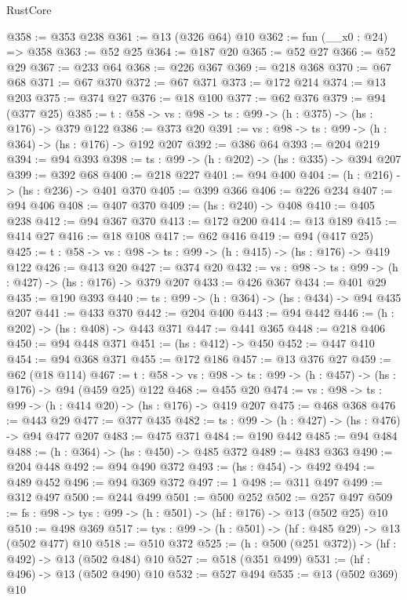 \begin{lexlean}{RustCore}
\begin{coremodule}
@358 := @353 @238
@361 := @13 (@326 @64) @10
@362 := fun (__x0 : @24) => @358
@363 := @52 @25
@364 := @187 @20
@365 := @52 @27
@366 := @52 @29
@367 := @233 @64
@368 := @226 @367
@369 := @218 @368
@370 := @67 @68
@371 := @67 @370
@372 := @67 @371
@373 := @172 @214
@374 := @13 @203
@375 := @374 @27
@376 := @18 @100
@377 := @62 @376
@379 := @94 (@377 @25)
@385 := {t : @58} -> {vs : @98} -> {ts : @99} -> (h : @375) -> (hs : @176) -> @379 @122
@386 := @373 @20
@391 := {vs : @98} -> {ts : @99} -> (h : @364) -> (hs : @176) -> @192 @207
@392 := @386 @64
@393 := @204 @219
@394 := @94 @393
@398 := {ts : @99} -> (h : @202) -> (hs : @335) -> @394 @207
@399 := @392 @68
@400 := @218 @227
@401 := @94 @400
@404 := (h : @216) -> (hs : @236) -> @401 @370
@405 := @399 @366
@406 := @226 @234
@407 := @94 @406
@408 := @407 @370
@409 := (hs : @240) -> @408
@410 := @405 @238
@412 := @94 @367 @370
@413 := @172 @200
@414 := @13 @189
@415 := @414 @27
@416 := @18 @108
@417 := @62 @416
@419 := @94 (@417 @25)
@425 := {t : @58} -> {vs : @98} -> {ts : @99} -> (h : @415) -> (hs : @176) -> @419 @122
@426 := @413 @20
@427 := @374 @20
@432 := {vs : @98} -> {ts : @99} -> (h : @427) -> (hs : @176) -> @379 @207
@433 := @426 @367
@434 := @401 @29
@435 := @190 @393
@440 := {ts : @99} -> (h : @364) -> (hs : @434) -> @94 @435 @207
@441 := @433 @370
@442 := @204 @400
@443 := @94 @442
@446 := (h : @202) -> (hs : @408) -> @443 @371
@447 := @441 @365
@448 := @218 @406
@450 := @94 @448 @371
@451 := (hs : @412) -> @450
@452 := @447 @410
@454 := @94 @368 @371
@455 := @172 @186
@457 := @13 @376 @27
@459 := @62 (@18 @114)
@467 := {t : @58} -> {vs : @98} -> {ts : @99} -> (h : @457) -> (hs : @176) -> @94 (@459 @25) @122
@468 := @455 @20
@474 := {vs : @98} -> {ts : @99} -> (h : @414 @20) -> (hs : @176) -> @419 @207
@475 := @468 @368
@476 := @443 @29
@477 := @377 @435
@482 := {ts : @99} -> (h : @427) -> (hs : @476) -> @94 @477 @207
@483 := @475 @371
@484 := @190 @442
@485 := @94 @484
@488 := (h : @364) -> (hs : @450) -> @485 @372
@489 := @483 @363
@490 := @204 @448
@492 := @94 @490 @372
@493 := (hs : @454) -> @492
@494 := @489 @452
@496 := @94 @369 @372
@497 := 1
@498 := @311 @497
@499 := @312 @497
@500 := @244 @499
@501 := @500 @252
@502 := @257 @497
@509 := {fs : @98} -> {tys : @99} -> (h : @501) -> (hf : @176) -> @13 (@502 @25) @10
@510 := @498 @369
@517 := {tys : @99} -> (h : @501) -> (hf : @485 @29) -> @13 (@502 @477) @10
@518 := @510 @372
@525 := (h : @500 (@251 @372)) -> (hf : @492) -> @13 (@502 @484) @10
@527 := @518 (@351 @499)
@531 := (hf : @496) -> @13 (@502 @490) @10
@532 := @527 @494
@535 := @13 (@502 @369) @10

\end{coremodule}
\end{lexlean}
